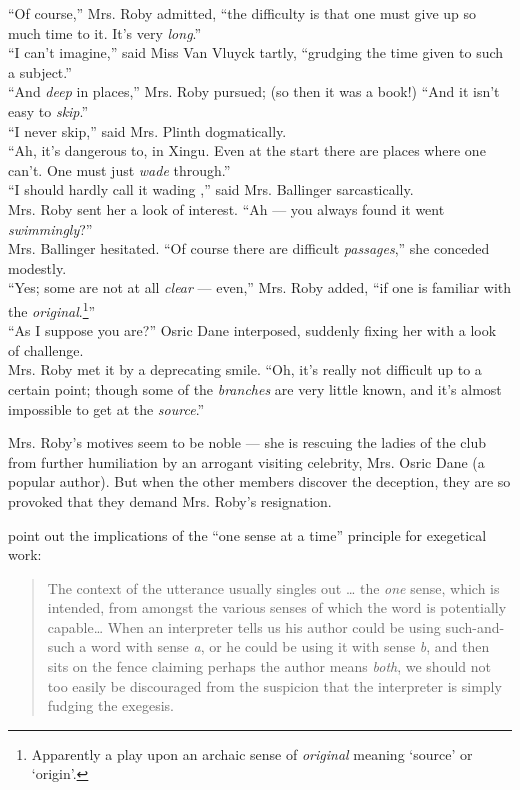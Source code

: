 \ea \label{ex:5.17}
“Of course,” Mrs. Roby admitted, “the difficulty is that one must give up so much time to it. It’s very \textit{long}.”\\
“I can’t imagine,” said Miss Van Vluyck tartly, “grudging the time given to such a subject.”\\
“And \textit{deep} in places,” Mrs. Roby pursued; (so then it was a book!) “And it isn’t easy to \textit{skip}.”\\
“I never skip,” said Mrs. Plinth dogmatically.\\
“Ah, it’s dangerous to, in Xingu. Even at the start there are places where one can’t. One must just \textit{wade} through.”\\
“I should hardly call it wading ,” said Mrs. Ballinger sarcastically.\\
Mrs. Roby sent her a look of interest. “Ah — you always found it went \textit{swimmingly}?”\\
Mrs. Ballinger hesitated. “Of course there are difficult \textit{passages},” she conceded modestly.\\
“Yes; some are not at all \textit{clear} — even,” Mrs. Roby added, “if one is familiar with the \textit{original}.\footnote{Apparently a play upon an archaic sense of \textit{original} meaning ‘source’ or ‘origin’.}”\\
“As I suppose you are?” Osric Dane interposed, suddenly fixing her with a look of challenge.\\
Mrs. Roby met it by a deprecating smile. “Oh, it’s really not difficult up to a certain point; though some of the \textit{branches} are very little known, and it’s almost impossible to get at the \textit{source}.”
\z

Mrs. Roby’s motives seem to be noble — she is rescuing the ladies of the club from further humiliation by an arrogant visiting celebrity, Mrs. Osric Dane (a popular author). But when the other members discover the deception, they are so provoked that they demand Mrs. Roby’s resignation.

\citet[175]{CotterellTurner1989} point out the implications of the “one sense at a time” principle for exegetical work:

\begin{quote}
The context of the utterance usually singles out … the \textit{one} sense, which is intended, from amongst the various senses of which the word is potentially capable…  When an interpreter tells us his author could be using such-and-such a word with sense \textit{a}, or he could be using it with sense \textit{b}, and then sits on the fence claiming perhaps the author means \textit{both}, we should not too easily be discouraged from the suspicion that the interpreter is simply fudging the exegesis.
\end{quote}


